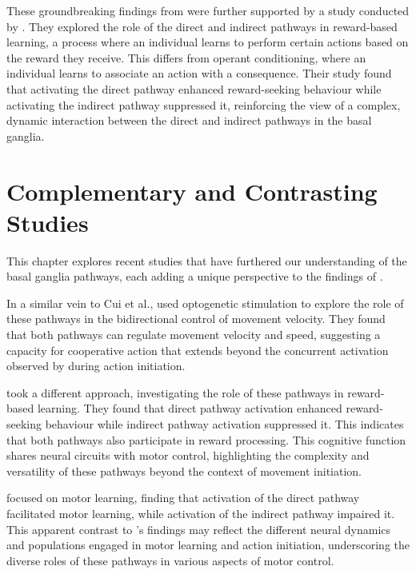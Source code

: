 \documentclass[10pt]{article}
\begin{document}
\begin{sloppypar}
  These groundbreaking findings from \cite{cui_concurrent_2013} were further supported by a study conducted by \cite{guillaumin_experimental_2021}. They explored the role of the direct and indirect pathways in reward-based learning, a process where an individual learns to perform certain actions based on the reward they receive. This differs from operant conditioning, where an individual learns to associate an action with a consequence. Their study found that activating the direct pathway enhanced reward-seeking behaviour while activating the indirect pathway suppressed it, reinforcing the view of a complex, dynamic interaction between the direct and indirect pathways in the basal ganglia.

  \section{Complementary and Contrasting Studies}
  \label{sec:complementary-and-contrasting-studies}

  This chapter explores recent studies that have furthered our understanding of the basal ganglia pathways, each adding a unique perspective to the findings of \cite{cui_concurrent_2013}.

  In a similar vein to Cui et al., \cite{yttri_opponent_2016} used optogenetic stimulation to explore the role of these pathways in the bidirectional control of movement velocity. They found that both pathways can regulate movement velocity and speed, suggesting a capacity for cooperative action that extends beyond the concurrent activation observed by \cite{cui_concurrent_2013} during action initiation.

  \cite{guillaumin_experimental_2021} took a different approach, investigating the role of these pathways in reward-based learning. They found that direct pathway activation enhanced reward-seeking behaviour while indirect pathway activation suppressed it. This indicates that both pathways also participate in reward processing. This cognitive function shares neural circuits with motor control, highlighting the complexity and versatility of these pathways beyond the context of movement initiation.

  \cite{hilt_evidence_2016} focused on motor learning, finding that activation of the direct pathway facilitated motor learning, while activation of the indirect pathway impaired it. This apparent contrast to \cite{cui_concurrent_2013} ’s findings may reflect the different neural dynamics and populations engaged in motor learning and action initiation, underscoring the diverse roles of these pathways in various aspects of motor control.


\end{sloppypar}
\end{document}

